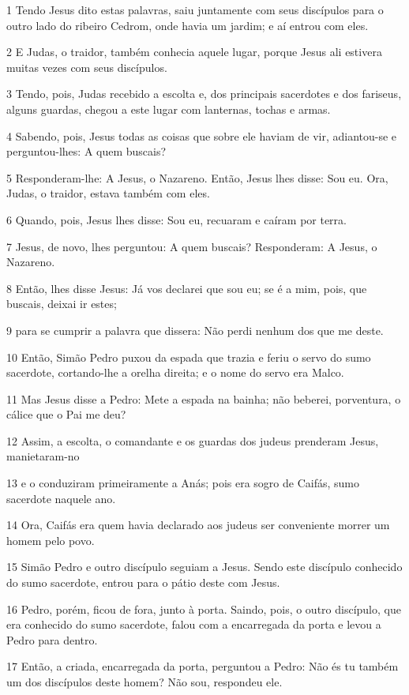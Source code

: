 \par 1 Tendo Jesus dito estas palavras, saiu juntamente com seus discípulos para o outro lado do ribeiro Cedrom, onde havia um jardim; e aí entrou com eles.
\par 2 E Judas, o traidor, também conhecia aquele lugar, porque Jesus ali estivera muitas vezes com seus discípulos.
\par 3 Tendo, pois, Judas recebido a escolta e, dos principais sacerdotes e dos fariseus, alguns guardas, chegou a este lugar com lanternas, tochas e armas.
\par 4 Sabendo, pois, Jesus todas as coisas que sobre ele haviam de vir, adiantou-se e perguntou-lhes: A quem buscais?
\par 5 Responderam-lhe: A Jesus, o Nazareno. Então, Jesus lhes disse: Sou eu. Ora, Judas, o traidor, estava também com eles.
\par 6 Quando, pois, Jesus lhes disse: Sou eu, recuaram e caíram por terra.
\par 7 Jesus, de novo, lhes perguntou: A quem buscais? Responderam: A Jesus, o Nazareno.
\par 8 Então, lhes disse Jesus: Já vos declarei que sou eu; se é a mim, pois, que buscais, deixai ir estes;
\par 9 para se cumprir a palavra que dissera: Não perdi nenhum dos que me deste.
\par 10 Então, Simão Pedro puxou da espada que trazia e feriu o servo do sumo sacerdote, cortando-lhe a orelha direita; e o nome do servo era Malco.
\par 11 Mas Jesus disse a Pedro: Mete a espada na bainha; não beberei, porventura, o cálice que o Pai me deu?
\par 12 Assim, a escolta, o comandante e os guardas dos judeus prenderam Jesus, manietaram-no
\par 13 e o conduziram primeiramente a Anás; pois era sogro de Caifás, sumo sacerdote naquele ano.
\par 14 Ora, Caifás era quem havia declarado aos judeus ser conveniente morrer um homem pelo povo.
\par 15 Simão Pedro e outro discípulo seguiam a Jesus. Sendo este discípulo conhecido do sumo sacerdote, entrou para o pátio deste com Jesus.
\par 16 Pedro, porém, ficou de fora, junto à porta. Saindo, pois, o outro discípulo, que era conhecido do sumo sacerdote, falou com a encarregada da porta e levou a Pedro para dentro.
\par 17 Então, a criada, encarregada da porta, perguntou a Pedro: Não és tu também um dos discípulos deste homem? Não sou, respondeu ele.
